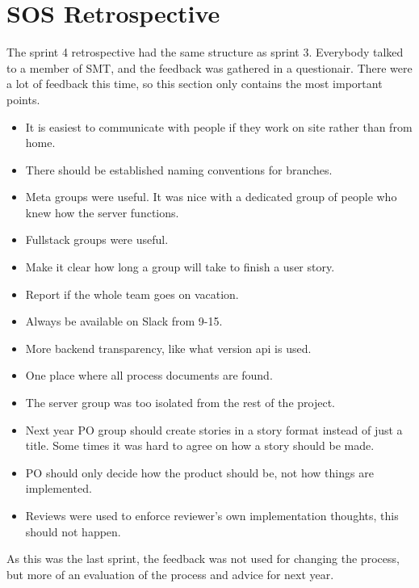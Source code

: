 \section{SOS Retrospective}

The sprint 4 retrospective had the same structure as sprint 3. Everybody talked to a member of \gls{SMT}, and the feedback was gathered in a questionair. There were a lot of feedback this time, so this section only contains the most important points. 

\begin{itemize}
    \item It is easiest to communicate with people if they work on site rather than from home.
    \item There should be established naming conventions for branches.
    \item Meta groups were useful. It was nice with a dedicated group of people who knew how the server functions.
    \item Fullstack groups were useful.
    \item Make it clear how long a group will take to finish a user story.
    \item Report if the whole team goes on vacation.
    \item Always be available on Slack from 9-15.
    \item More backend transparency, like what version api is used.
    \item One place where all process documents are found.
    \item The server group was too isolated from the rest of the project. 
    \item Next year PO group should create stories in a story format instead of just a title. Some times it was hard to agree on how a story should be made. 
    \item PO should only decide how the product should be, not how things are implemented.
    \item Reviews were used to enforce reviewer's own implementation thoughts, this should not happen. 
\end{itemize}

As this was the last sprint, the feedback was not used for changing the process, but more of an evaluation of the process and advice for next year.
